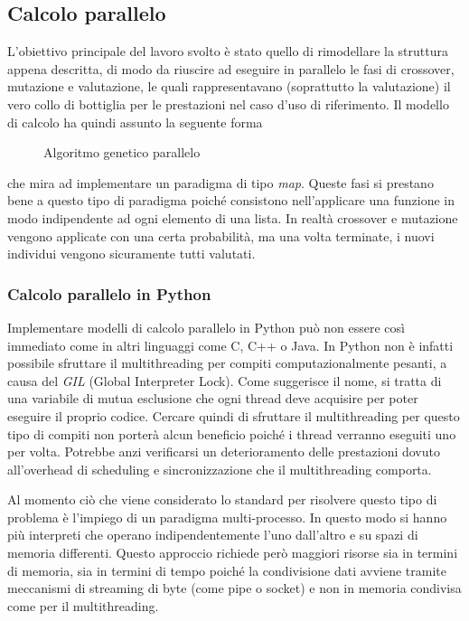 \subsection{Calcolo parallelo}

L'obiettivo principale del lavoro svolto è stato quello di rimodellare la
struttura appena descritta, di modo da riuscire ad eseguire in parallelo le
fasi di crossover, mutazione e valutazione, le quali rappresentavano
(soprattutto la valutazione) il vero collo di bottiglia per le prestazioni nel
caso d'uso di riferimento. Il modello di calcolo ha quindi assunto la seguente
forma
\begin{figure}
      \centering
      
      \caption{Algoritmo genetico parallelo}
      \label{fig: parallel_ga}
\end{figure}
che mira ad implementare un paradigma di tipo \textit{map}. Queste fasi
si prestano bene a questo tipo di paradigma poiché consistono
nell'applicare una funzione in modo indipendente ad ogni elemento di una
lista. In realtà crossover e mutazione vengono applicate con una certa
probabilità, ma una volta terminate, i nuovi individui vengono
sicuramente tutti valutati.

\subsubsection{Calcolo parallelo in Python}

Implementare modelli di calcolo parallelo in Python può non essere così
immediato come in altri linguaggi come C, C++ o Java. In Python non è infatti
possibile sfruttare il multithreading per compiti computazionalmente pesanti,
a causa del \textit{GIL} (Global Interpreter Lock). Come suggerisce il nome,
si tratta di una variabile di mutua esclusione che ogni thread deve acquisire
per poter eseguire il proprio codice. Cercare quindi di sfruttare il
multithreading per questo tipo di compiti non porterà alcun beneficio poiché
i thread verranno eseguiti uno per volta. Potrebbe anzi verificarsi un
deterioramento delle prestazioni dovuto all'overhead di scheduling e
sincronizzazione che il multithreading comporta.

Al momento ciò che viene considerato lo standard per risolvere questo tipo di
problema è l'impiego di un paradigma multi-processo. In questo modo si hanno
più interpreti che operano indipendentemente l'uno dall'altro e su spazi di
memoria differenti. Questo approccio richiede però maggiori risorse sia in
termini di memoria, sia in termini di tempo poiché la condivisione dati avviene
tramite meccanismi di streaming di byte (come pipe o socket) e non in memoria
condivisa come per il multithreading.

